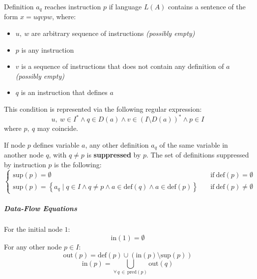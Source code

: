 \documentclass[english]{article}
\begin{document}
\begin{definition}
  \label{def:reaching-definition-regular-expression}
  Definition \(a_q\) reaches instruction \(p\) if language \(L(A)\) contains a sentence of the form \(x = u q v p w\), where:
  \begin{itemize}
    \item \(u, \ w\) are arbitrary sequence of instructions \textit{(possibly empty)}
    \item \(p\) is any instruction
    \item \(v\) is a sequence of instructions that does not contain any definition of \(a\) \textit{(possibly empty)}
    \item \(q\) is an instruction that defines \(a\)
  \end{itemize}

  This condition is represented via the following regular expression:
  \[ u, \ w \in I^\ast \land q \in D\left( a \right) \land v \in \left( I \setminus D \left( a \right)\right)^\ast \land p \in I \]
  where \(p, \ q\) may coincide.
\end{definition}

\begin{definition}
  \label{def:reaching-definition-data-flow-equations}
  If node \(p\) defines variable \(a\), any other definition \(a_q\) of the same variable in another node \(q\), with \(q \neq p\) is \textbf{suppressed} by \(p\).
  The set of definitions suppressed by instruction \(p\) is the following:
  \[\begin{cases}
      \text{sup}(p) = \emptyset \quad                                                                                             & \text{if} \ \text{def}(p) = \emptyset    \\
      \text{sup}(p) = \left\{ a_q \mid q \in I \land q \neq p \land a \in \text{def} (q) \land a \in \text{def}(p) \right\} \quad & \text{if} \ \text{def}(p) \neq \emptyset
    \end{cases}\]
\end{definition}

\subparagraph*{Data-Flow Equations}

For the initial node \(1\):
\[
  \label{eq:reaching-definition-data-flow-equations-1}\tag{A}\text{in}(1) = \emptyset
\]
For any other node \(p \in I\):
\[
  \label{eq:reaching-definition-data-flow-equations-2}\tag{B}\text{out}(p) = \text{def}(p) \cup \left( \text{in}(p) \setminus \text{sup}(p) \right)
\]
\[
  \label{eq:reaching-definition-data-flow-equations-3}\tag{C}\text{in}(p) = \bigcup_{\forall \, q \, \in \, \text{pred}(p)} \text{out}(q)
\]
\end{document}
